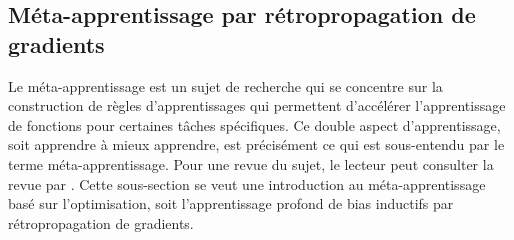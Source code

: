 




\subsection{Méta-apprentissage par rétropropagation de gradients}

Le méta-apprentissage est un sujet de recherche qui se concentre sur la construction de règles d'apprentissages qui permettent 
d'accélérer l'apprentissage de fonctions pour certaines tâches spécifiques. Ce double aspect d'apprentissage, soit apprendre à mieux 
apprendre, est précisément ce qui est sous-entendu par le terme méta-apprentissage. Pour une revue du sujet, le lecteur peut consulter 
la revue par \citet{Hospedales2020}. Cette sous-section se veut une introduction au méta-apprentissage basé sur l'optimisation,
soit l'apprentissage profond de bias inductifs par rétropropagation de gradients.

